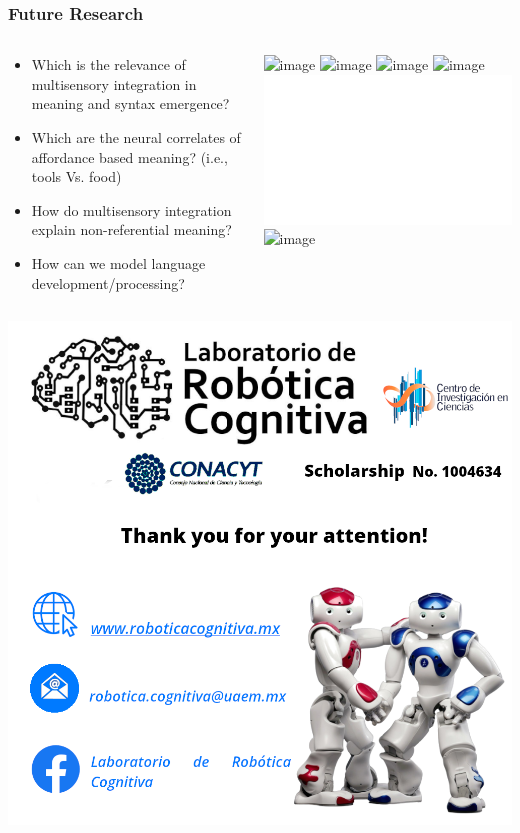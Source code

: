 \documentclass{beamer}
\begin{document}
\begin{frame}
\frametitle{Future Research}
\begin{columns}
\begin{small}
\begin{itemize}
\item<1>{Which is the relevance of multisensory integration in meaning and syntax emergence?}
\item<2>{Which are the neural correlates of affordance based meaning? (i.e., tools Vs. food)}
\item<3>{How do multisensory integration explain non-referential meaning?}
\item<4>{How can we model language development/processing?}
\end{itemize}
\end{small}
\includegraphics<1>[width=\textwidth]{images/multisensory}
\includegraphics<2>[width=\textwidth]{images/covermultisensory}
\includegraphics<2>[width=\textwidth]{images/familiarization}
\includegraphics<3>[width=\textwidth]{images/dead}
\includegraphics<4>[width=\textwidth]{images/architecturePhD.pdf}
\includegraphics<4>[width=\textwidth]{images/robot}
\end{columns}
\begin{center}
\begin{tiny}
\cite{Barsalou2003, Barsalou2018,Kuhnke2020 ,Twomey2020}
\end{tiny}
\end{center}
\end{frame}

\begin{frame}
\centering
\includegraphics[width=.8\textwidth]{images/contact}
\end{frame}
\end{document}
